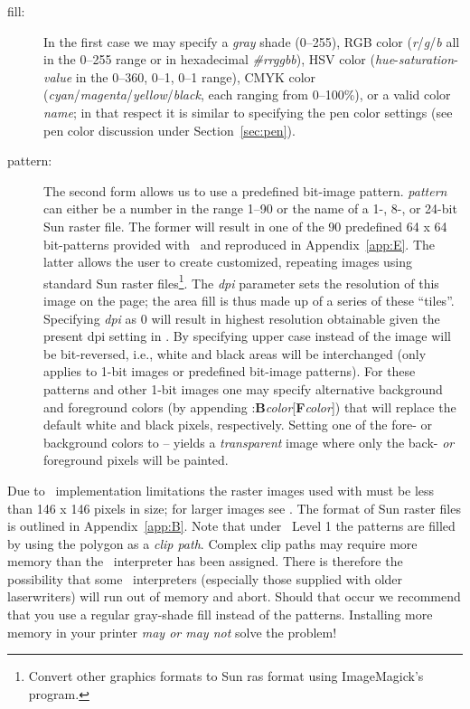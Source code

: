 \vspace{\baselineskip} 
\noindent
\begin{description}
\item [fill:]
In the first case we may specify a \emph{gray} shade (0--255), RGB color
(\emph{r}/\emph{g}/\emph{b} all in the 0--255 range or in hexadecimal \emph{\#rrggbb}), HSV color (\emph{hue}-\emph{saturation}-\emph{value}
in the 0--360, 0--1, 0--1 range), CMYK color (\emph{cyan}/\emph{magenta}/\emph{yellow}/\emph{black},
each ranging from 0--100\%), or a valid color \emph{name}; in that respect it is similar
to specifying the pen color settings (see pen color discussion under Section~\ref{sec:pen}).
\item [pattern:]
The second form allows us to use a predefined bit-image pattern.
\emph{pattern} can either be a number in the range 1--90 or the name of a 1-,
8-, or 24-bit Sun raster file.  The former will result in one of the 90
predefined 64 x 64 bit-patterns provided with \GMT\ and reproduced in Appendix~\ref{app:E}.
The latter allows the user to create customized, repeating images using
standard Sun raster files\footnote{Convert other graphics formats to Sun ras format using
ImageMagick's  program.}.  The \emph{dpi} parameter sets the resolution of
this image on the page;  the area fill is thus made up of a series of these
``tiles''.  Specifying \emph{dpi} as 0 will result in highest resolution
obtainable given the present dpi setting in .
By specifying upper case  instead of  the image will be
bit-reversed, i.e., white and black areas will be interchanged (only applies
to 1-bit images or predefined bit-image patterns).  For these patterns and
other 1-bit images one may specify alternative background and foreground
colors (by appending :\textbf{B}\emph{color}[\textbf{F}\emph{color}]) that will
replace the default white and black pixels, respectively.  Setting one of the
fore- or background colors to -- yields a \emph{transparent} image where only the
back- \emph{or} foreground pixels will be painted.
\end{description}

Due to \PS\ implementation limitations the raster images used with
 must be less than 146 x 146 pixels in size; for larger images see
.  The format of Sun raster files is outlined in Appendix~\ref{app:B}.
Note that under \PS\ Level 1 the patterns are filled by using
the polygon as a \emph{clip path}.  Complex clip paths may require
more memory than the \PS\ interpreter has been assigned.
There is therefore the possibility that some \PS\ interpreters
(especially those supplied with older laserwriters) will run out of memory
and abort.  Should that occur we recommend that you use a regular gray-shade
fill instead of the patterns.  Installing more memory in your printer
\emph{may or may not} solve the problem! 

